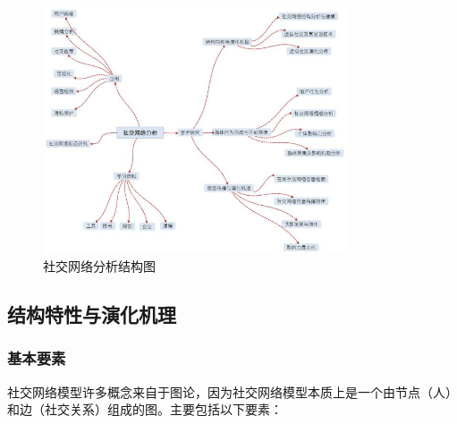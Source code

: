 \documentclass[12pt]{report}
\begin{document}
		\begin{figure}
			\centering
			\includegraphics[width=0.8\textwidth]{img/SNA.jpg}
			\caption{社交网络分析结构图} 
			\label{img}
		\end{figure}
		
		\subsection{结构特性与演化机理}
		
			\subsubsection{基本要素}
			
				社交网络模型许多概念来自于图论，因为社交网络模型本质上是一个由节点（人）和边（社交关系）组成的图。主要包括以下要素：
				
\end{document}
